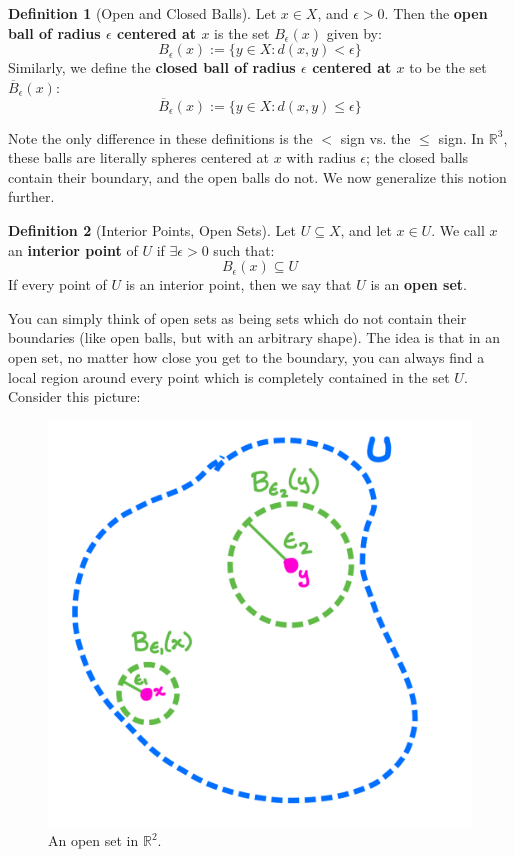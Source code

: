 \documentclass[11pt, oneside]{amsart}   	%
\theoremstyle{definition}
\newtheorem{definition}{Definition}[section]
\begin{document}
	\begin{definition}[Open and Closed Balls]
		Let $x\in X$, and $\epsilon > 0$. Then the \textbf{open ball of radius $\epsilon$ centered at $x$} is the set $B_\epsilon(x)$ given by:
		$$
			B_\epsilon(x) := \{y\in X : d(x, y) < \epsilon\}
		$$
		Similarly, we define the \textbf{closed ball of radius $\epsilon$ centered at $x$} to be the set $\overline B_\epsilon(x)$:
		$$
			\overline B_\epsilon(x) := \{y\in X : d(x, y)\leq\epsilon\}
		$$
	\end{definition}
	
	Note the only difference in these definitions is the $<$ sign vs. the $\leq$ sign. In $\mathbb R^3$, these balls are literally spheres centered at $x$ with radius 
	$\epsilon$; the closed balls contain their boundary, and the open balls do not. We now generalize this notion further.
	
	\begin{definition}[Interior Points, Open Sets]
		Let $U\subseteq X$, and let $x\in U$. We call $x$ an \textbf{interior point} of $U$ if $\exists\epsilon > 0$ such that:
		$$
			B_\epsilon(x)\subseteq U
		$$
		If every point of $U$ is an interior point, then we say that $U$ is an \textbf{open set}.
	\end{definition}
	
	You can simply think of open sets as being sets which do not contain their boundaries (like open balls, but with an arbitrary shape). The idea is that in an 
	open set, no matter how close you get to the boundary, you can always find a local region around every point which is completely contained in the set $U$. 
	Consider this picture:
	
	\begin{figure}[H]
		\centering
		\includegraphics[width = .5\textwidth]{open_set}
		\caption{An open set in $\mathbb R^2$.}
	\end{figure}
	
\end{document}
